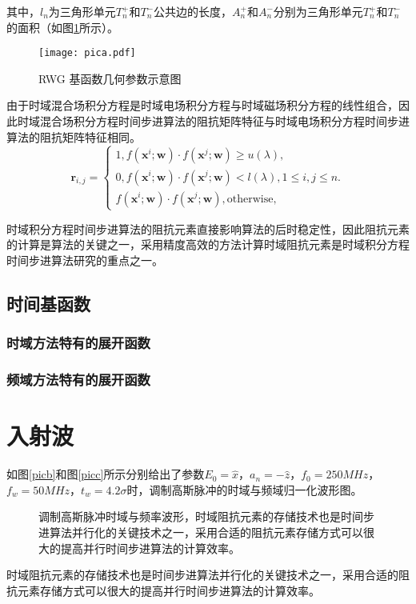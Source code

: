 其中，$l_n$为三角形单元$T_n^+$和$T_n^-$公共边的长度，$A_n^+$和$A_n^-$分别为三角形单元$T_n^+$和$T_n^-$的面积（如图\ref{pica}所示）。

\begin{figure}[h]
	\texttt{[image: pica.pdf]}
	\caption{RWG 基函数几何参数示意图}
	\label{pica}
\end{figure}
由于时域混合场积分方程是时域电场积分方程与时域磁场积分方程的线性组合，因此时域混合场积分方程时间步进算法的阻抗矩阵特征与时域电场积分方程时间步进算法的阻抗矩阵特征相同。
\begin{equation}
\label{latent_binary_variable}
\mathbf{r}_{i,j}=
\begin{cases}
1,f(\mathbf{x}^{i};\mathbf{w})\cdot f(\mathbf{x}^{j};\mathbf{w})\geq u(\lambda),\\
0,f(\mathbf{x}^{i};\mathbf{w})\cdot f(\mathbf{x}^{j};\mathbf{w})< l(\lambda), 1\leq i,j\leq n.\\
f(\mathbf{x}^{i};\mathbf{w})\cdot f(\mathbf{x}^{j};\mathbf{w}),\text{otherwise},
\end{cases}
\end{equation}

时域积分方程时间步进算法的阻抗元素直接影响算法的后时稳定性，因此阻抗元素的计算是算法的关键之一，采用精度高效的方法计算时域阻抗元素是时域积分方程时间步进算法研究的重点之一。


\subsection{时间基函数}

\subsubsection{时域方法特有的展开函数}

\subsubsection{频域方法特有的展开函数}

\section{入射波}

如图\ref{picb}和图\ref{picc}所示分别给出了参数$E_0=\hat{x}$，$a_n=-\hat{z}$，$f_0=250MHz$，$f_w=50MHz$，$t_w=4.2\sigma$时，调制高斯脉冲的时域与频域归一化波形图。

\begin{figure}[h]
	\caption{调制高斯脉冲时域与频率波形，时域阻抗元素的存储技术也是时间步进算法并行化的关键技术之一，采用合适的阻抗元素存储方式可以很大的提高并行时间步进算法的计算效率。}
	\label{fig1}
\end{figure}
时域阻抗元素的存储技术也是时间步进算法并行化的关键技术之一，采用合适的阻抗元素存储方式可以很大的提高并行时间步进算法的计算效率。

